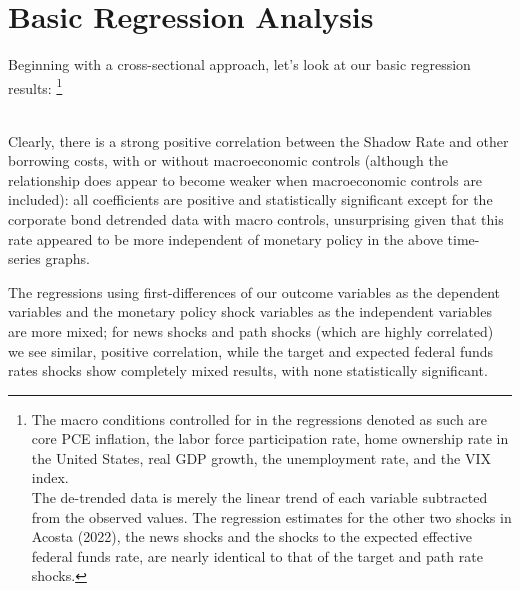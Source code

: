 \documentclass[12pt,final]{article}
\begin{document}
\section{Basic Regression Analysis}
Beginning with a cross-sectional approach, let's look at our basic regression results: \footnote{The macro conditions controlled for in the regressions denoted as such are core PCE inflation, the labor force participation rate, home ownership rate in the United States, real GDP growth, the unemployment rate, and the VIX index. \\ 
The de-trended data is merely the linear trend of each variable subtracted from the observed values. The regression estimates for the other two shocks in Acosta (2022), the news shocks and the shocks to the expected effective federal funds rate, are nearly identical to that of the target and path rate shocks.} \\

 \\
Clearly, there is a strong positive correlation between the Shadow Rate and other borrowing costs, with or without macroeconomic controls (although the relationship does appear to become weaker when macroeconomic controls are included): all coefficients are positive and statistically significant except for the corporate bond detrended data with macro controls, unsurprising given that this rate appeared to be more independent of monetary policy in the above time-series graphs.

The regressions using first-differences of our outcome variables as the dependent variables and the monetary policy shock variables as the independent variables are more mixed; for news shocks and path shocks (which are highly correlated) we see similar, positive correlation, while the target and expected federal funds rates shocks show completely mixed results, with none statistically significant.
\end{document}
